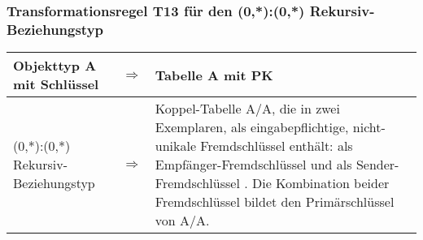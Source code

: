         \subsubsection{Transformationsregel T13 f\"ur den (0,*):(0,*) Rekursiv-Beziehungstyp}
          \begin{supertabular}[h]{|l|l|p{7.5cm}|}
            \footnotesize Objekttyp A mit Schl\"ussel  & $\Rightarrow $ & \footnotesize Tabelle A mit PK \\
            \hline
            \footnotesize (0,*):(0,*) Rekursiv-Beziehungstyp & $\Rightarrow $ & \footnotesize Koppel-Tabelle A/A, die  in zwei Exemplaren, als eingabepflichtige, nicht-unikale Fremdschl\"ussel enth\"alt: als Empf\"anger-Fremdschl\"ussel  und als Sender-Fremdschl\"ussel . Die Kombination beider Fremdschl\"ussel bildet den Prim\"arschl\"ussel von A/A.\\
          \end{supertabular}


